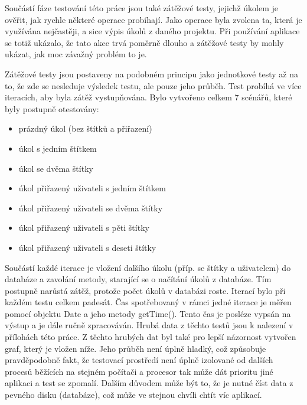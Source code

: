 Součástí fáze testování této práce jsou také zátěžové testy, jejichž úkolem je ověřit, jak rychle některé operace probíhají. Jako operace byla zvolena ta, která je využívána nejčastěji, a sice výpis úkolů z daného projektu. Při používání aplikace se totiž ukázalo, že tato akce trvá poměrně dlouho a zátěžové testy by mohly ukázat, jak moc závažný problém to je.

Zátěžové testy jsou postaveny na podobném principu jako jednotkové testy až na to, že zde se nesleduje výsledek testu, ale pouze jeho průběh. Test probíhá ve více iteracích, aby byla zátěž vystupňována. Bylo vytvořeno celkem 7 scénářů, které byly postupně otestovány:

\begin{itemize}
\item prázdný úkol (bez štítků a přiřazení)
\item úkol s jedním štítkem
\item úkol se dvěma štítky
\item úkol přiřazený uživateli s jedním štítkem
\item úkol přiřazený uživateli se dvěma štítky
\item úkol přiřazený uživateli s pěti štítky
\item úkol přiřazený uživateli s deseti štítky
\end{itemize}

Součástí každé iterace je vložení dalšího úkolu (příp. se štítky a uživatelem) do databáze a zavolání metody, starající se o načítání úkolů z databáze. Tím postupně narůstá zátěž, protože počet úkolů v databázi roste. Iterací bylo při každém testu celkem padesát. Čas spotřebovaný v rámci jedné iterace je měřen pomocí objektu Date a jeho metody getTime(). Tento čas je posléze vypsán na výstup a je dále ručně zpracováván. Hrubá data z těchto testů jsou k nalezení v přílohách této práce. Z těchto hrubých dat byl také pro lepší názornost vytvořen graf, který je vložen níže. Jeho průběh není úplně hladký, což způsobuje pravděpodobně fakt, že testovací prostředí není úplně izolované od dalších procesů běžících na stejném počítači a procesor tak může dát prioritu jiné aplikaci a test se zpomalí. Dalším důvodem může být to, že je nutné číst data z pevného disku (databáze), což může ve stejnou chvíli chtít víc aplikací.

